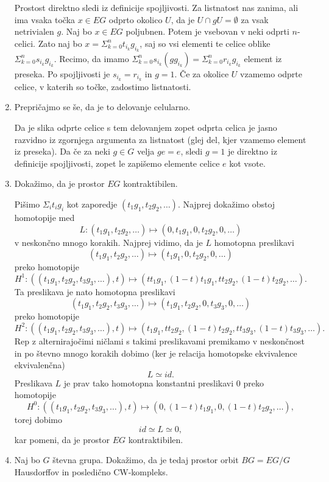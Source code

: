 \documentclass[a4paper, 12pt]{article}
\newcommand{\htpeq}{\simeq}
\begin{document}
\begin{enumerate}[label=(\alph*)]
	Prostost direktno sledi iz definicije spojljivosti. Za listnatost nas zanima, ali ima vsaka točka $x \in EG$ odprto okolico $U$, da je $U \cap gU = \emptyset$ za vsak netrivialen $g$. Naj bo $x \in EG$ poljubnen. Potem je vsebovan v neki odprti  $n$-celici. Zato naj bo $x = \Sigma_{k = 0}^n t_{i_k}g_{i_k}$, saj so vsi elementi te celice oblike $\Sigma_{k = 0}^n s_{i_k}g_{i_k}$. Recimo, da imamo $\Sigma_{k = 0}^n s_{i_k}(gg_{i_k}) = \Sigma_{k=0}^n r_{i_k}g_{i_k}$ element iz preseka. Po spojljivosti je $s_{i_k} = r_{i_k}$ in $g = 1$. Če za okolice $U$ vzamemo odprte celice, v katerih so točke, zadostimo listnatosti.
	
	\item Prepričajmo se še, da je to delovanje celularno.
	
	Da je slika odprte celice s tem delovanjem zopet odprta celica je jasno razvidno iz zgornjega argumenta za listnatost (glej del, kjer vzamemo element iz preseka). Da če za neki $g \in G$ velja $ge = e$, sledi $g=1$ je direktno iz definicije spojljivosti, zopet le zapišemo elemente celice $e$ kot vsote.
	
	\item Dokažimo, da je prostor $EG$ kontraktibilen.
	
	Pišimo $\Sigma_i t_ig_i$ kot zaporedje $(t_1g_1, t_2g_2, \dots)$. Najprej dokažimo obstoj homotopije med
	\[
	L\colon (t_1g_1, t_2g_2, \dots) \mapsto (0, t_1g_1, 0, t_2g_2, 0, \dots)
	\]
	 v neskončno mnogo korakih. Najprej vidimo, da je $L$ homotopna preslikavi
	 \[
	 (t_1g_1, t_2g_2,\dots) \mapsto (t_1g_1, 0, t_2g_2, 0, \dots)
	 \]
	 preko homotopije
	\[
	H^1\colon ((t_1g_1, t_2g_2, t_3g_3, \dots), t) \mapsto (tt_1g_1, (1-t)t_1g_1, tt_2g_2, (1-t)t_2g_2, \dots).
	\]
	Ta preslikava je nato homotopna preslikavi
	\[
	(t_1g_1, t_2g_2, t_3g_3, \dots) \mapsto (t_1g_1, t_2g_2, 0, t_3g_3, 0, \dots)
	\]
	preko homotopije
	\[
	H^2\colon ((t_1g_1, t_2g_2, t_3g_3, \dots), t) \mapsto (t_1g_1, tt_2g_2, (1-t)t_2g_2, tt_3g_3, (1-t)t_3g_3, \dots).
	\]
	Rep z alternirajočimi ničlami s takimi preslikavami premikamo v neskončnost in po števno mnogo korakih dobimo (ker je relacija homotopske ekvivalence ekvivalenčna)
	\[
	L \htpeq id.
	\]
	Preslikava $L$ je prav tako homotopna konstantni preslikavi $0$ preko homotopije
	\[
	H^0 \colon ((t_1g_1, t_2g_2, t_3g_3, \dots), t) \mapsto (0, (1-t)t_1g_1, 0, (1-t)t_2g_2, \dots),
	\]
	torej dobimo
	\[
	id \htpeq L \htpeq 0,
	\]
	kar pomeni, da je prostor $EG$ kontraktibilen.
	
	\item Naj bo $G$ števna grupa. Dokažimo, da je tedaj prostor orbit $BG = EG/G$ Hausdorffov in posledično CW-kompleks.
	

\end{enumerate}
\end{document}
